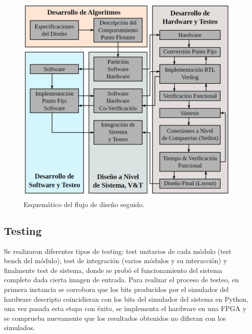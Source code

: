 \begin{figure}
\centering
\includegraphics{flujo_de_dis.png}
\caption{Esquemático del flujo de diseño seguido.}
\label{design_flow}
\end{figure}

\subsection{Testing}

Se realizaron diferentes tipos de testing: test
unitarios de cada módulo (test bench del módulo), test de integración (varios
módulos y su interacción) y finalmente test de sistema, donde se probó el
funcionamiento del sistema completo dada cierta imagen de entrada. Para realizar
el proceso de testeo, en primera instancia se corrobora que los bits producidos
por el simulador del hardware descripto coincidieran con los bits del simulador
del sistema en Python, una vez pasada esta etapa con éxito, se implementa el
hardware en una FPGA y se comprueba nuevamente que los resultados obtenidos no
difieran con los simulados.